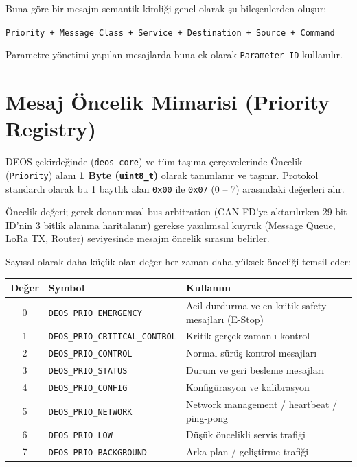 \documentclass[a4paper,10pt]{article}
\newcommand{\hex}[1]{\texttt{0x#1}}
\newcommand{\code}[1]{\texttt{#1}}
\begin{document}
Buna göre bir mesajın semantik kimliği genel olarak şu bileşenlerden oluşur:

\begin{center}
\code{Priority + Message Class + Service + Destination + Source + Command}
\end{center}

Parametre yönetimi yapılan mesajlarda buna ek olarak \code{Parameter ID} kullanılır.

\section{Mesaj Öncelik Mimarisi (Priority Registry)}

DEOS çekirdeğinde (\code{deos\_core}) ve tüm taşıma çerçevelerinde Öncelik (\code{Priority}) alanı \textbf{1 Byte (\code{uint8\_t})} olarak tanımlanır ve taşınır. Protokol standardı olarak bu 1 baytlık alan \hex{00} ile \hex{07} (0 -- 7) arasındaki değerleri alır.

Öncelik değeri; gerek donanımsal bus arbitration (CAN-FD'ye aktarılırken 29-bit ID'nin 3 bitlik alanına haritalanır) gerekse yazılımsal kuyruk (Message Queue, LoRa TX, Router) seviyesinde mesajın öncelik sırasını belirler.

Sayısal olarak daha küçük olan değer her zaman daha yüksek önceliği temsil eder:

\begin{center}
\begin{tabularx}{\textwidth}{c l X}
\toprule
Değer & Symbol & Kullanım \\
\midrule
0 & \code{DEOS\_PRIO\_EMERGENCY} & Acil durdurma ve en kritik safety mesajları (E-Stop) \\
1 & \code{DEOS\_PRIO\_CRITICAL\_CONTROL} & Kritik gerçek zamanlı kontrol \\
2 & \code{DEOS\_PRIO\_CONTROL} & Normal sürüş kontrol mesajları \\
3 & \code{DEOS\_PRIO\_STATUS} & Durum ve geri besleme mesajları \\
4 & \code{DEOS\_PRIO\_CONFIG} & Konfigürasyon ve kalibrasyon \\
5 & \code{DEOS\_PRIO\_NETWORK} & Network management / heartbeat / ping-pong \\
6 & \code{DEOS\_PRIO\_LOW} & Düşük öncelikli servis trafiği \\
7 & \code{DEOS\_PRIO\_BACKGROUND} & Arka plan / geliştirme trafiği \\
\bottomrule
\end{tabularx}
\end{center}
\end{document}
